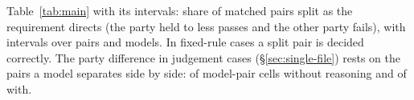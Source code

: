 \begin{table}[t]
\caption{Table~\ref{tab:main} with its intervals: share of matched pairs split as the requirement directs (the party held to less passes and the other party fails), with \ConfidenceLevel{} intervals over pairs and models. In fixed-rule cases a split pair is decided correctly. The party difference in judgement cases (\S\ref{sec:single-file}) rests on the pairs a model separates side by side: \PartyDiffAloneGivenSplitNoReasoningJudgementPairs{} of \PartyDiffAloneGivenSplitNoReasoningJudgementOf{} model-pair cells without reasoning and \PartyDiffAloneGivenSplitReasoningJudgementPairs{} of \PartyDiffAloneGivenSplitReasoningJudgementOf{} with.}
\label{tab:main-intervals}
\end{table}
